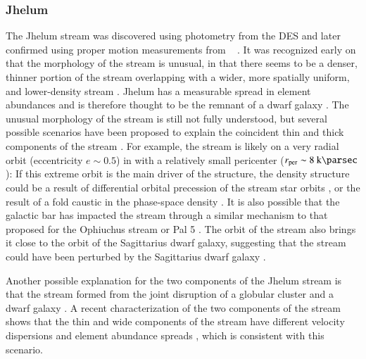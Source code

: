 \documentclass[final,5p,times,twocolumn,authoryear]{elsarticle}
\begin{document}
\subsubsection{Jhelum}
\label{sec:jhelum}

The Jhelum stream \citep{shipp:2018} was discovered using photometry from the DES and
later confirmed using proper motion measurements from \gaia\  \citep{shipp:2019}.
It was recognized early on that the morphology of the stream is unusual, in that there
seems to be a denser, thinner portion of the stream overlapping with a wider, more
spatially uniform, and lower-density stream \citep{bonaca:2019}.
Jhelum has a measurable spread in element abundances \citep{ji:2020, li:2022} and is
therefore thought to be the remnant of a dwarf galaxy \citep{sheffield:2021}.
The unusual morphology of the stream is still not fully understood, but several possible
scenarios have been proposed to explain the coincident thin and thick components of the
stream \citep[see, e.g., the discussion Section~5 of ][]{bonaca:2019}.
For example, the stream is likely on a very radial orbit (eccentricity $e \sim 0.5$) in
with a relatively small pericenter ($\rper \sim 8~\kpc$): If this extreme orbit is the
main driver of the structure, the density structure could be a result of differential
orbital precession of the stream star orbits \citep{erkal:2016b}, or the result of a
fold caustic in the phase-space density \citep{tremaine:1999}.
It is also possible that the galactic bar has impacted the stream through a similar
mechanism to that proposed for the Ophiuchus stream \citep{price-whelan:2016b} or Pal 5
\citep{pearson:2017}.
The orbit of the stream also brings it close to the orbit of the Sagittarius dwarf
galaxy, suggesting that the stream could have been perturbed by the Sagittarius dwarf
galaxy \citep{woudenberg:2023}.

Another possible explanation for the two components of the Jhelum stream is that the
stream formed from the joint disruption of a globular cluster and a dwarf galaxy
\citep{bonaca:2019}.
A recent characterization of the two components of the stream shows that the thin and
wide components of the stream have different velocity dispersions and element abundance
spreads \citep{awad:2024}, which is consistent with this scenario.


\end{document}
